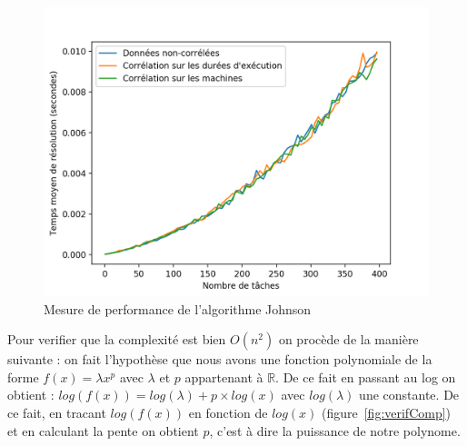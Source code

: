 \documentclass[a4paper, 10pt]{article}
\begin{document}
		\begin{figure}[H]
			\centering
			\includegraphics[width=0.85\linewidth]{graphes/Johnson.png}
			\caption{Mesure de performance de l'algorithme Johnson}
			\label{fig:tj}
		\end{figure}

                Pour verifier que la complexité est bien $O(n^2)$ on procède de la manière suivante : on fait l'hypothèse que nous avons une fonction polynomiale de la forme $f(x) = \lambda x^p$ avec $\lambda$ et $p$ appartenant à $\mathbb{R}$. De ce fait en passant au log on obtient : $log(f(x)) = log(\lambda) + p \times log(x)$ avec $log(\lambda)$ une constante. De ce fait, en tracant $log(f(x))$ en fonction de $log(x)$ (figure~\ref{fig:verifComp}) et en calculant la pente on obtient $p$, c'est à dire la puissance de notre polynome.
\end{document}
